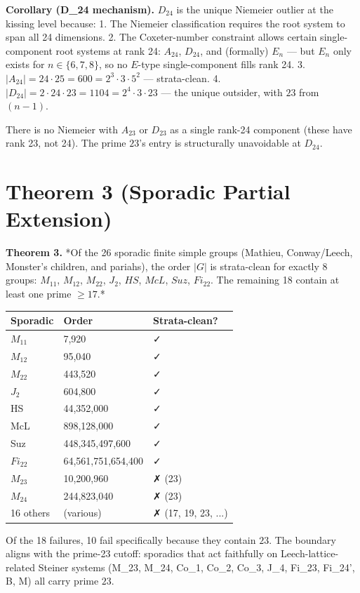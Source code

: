 \documentclass[11pt,reqno]{amsart}
\theoremstyle{plain}
\theoremstyle{definition}
\begin{document}
\textbf{Corollary (D_24 mechanism).} $D_{24}$ is the unique Niemeier outlier at the kissing level because:
1. The Niemeier classification requires the root system to span all 24 dimensions.
2. The Coxeter-number constraint allows certain single-component root systems at rank 24: $A_{24}$, $D_{24}$, and (formally) $E_n$ --- but $E_n$ only exists for $n \in \{6, 7, 8\}$, so no $E$-type single-component fills rank 24.
3. $|A_{24}| = 24 \cdot 25 = 600 = 2^3 \cdot 3 \cdot 5^2$ --- strata-clean.
4. $|D_{24}| = 2 \cdot 24 \cdot 23 = 1104 = 2^4 \cdot 3 \cdot 23$ --- the unique outsider, with $23$ from $(n-1)$.

There is no Niemeier with $A_{23}$ or $D_{23}$ as a single rank-24 component (these have rank 23, not 24). The prime $23$'s entry is structurally unavoidable at $D_{24}$.

\section{Theorem 3 (Sporadic Partial Extension)}

\textbf{Theorem 3.} *Of the 26 sporadic finite simple groups (Mathieu, Conway/Leech, Monster's children, and pariahs), the order $|G|$ is strata-clean for exactly 8 groups: $M_{11}$, $M_{12}$, $M_{22}$, $J_2$, $HS$, $McL$, $Suz$, $Fi_{22}$. The remaining 18 contain at least one prime $\geq 17$.*

\begin{center}
\begin{tabular}{lll}
\toprule
Sporadic & Order & Strata-clean? \\
\midrule
$M_{11}$ & 7,920 & ✓ \\
$M_{12}$ & 95,040 & ✓ \\
$M_{22}$ & 443,520 & ✓ \\
$J_2$ & 604,800 & ✓ \\
HS & 44,352,000 & ✓ \\
McL & 898,128,000 & ✓ \\
Suz & 448,345,497,600 & ✓ \\
$Fi_{22}$ & 64,561,751,654,400 & ✓ \\
$M_{23}$ & 10,200,960 & ✗ (23) \\
$M_{24}$ & 244,823,040 & ✗ (23) \\
16 others & (various) & ✗ (17, 19, 23, ...) \\
\bottomrule
\end{tabular}
\end{center}

Of the 18 failures, 10 fail specifically because they contain $23$. The boundary aligns with the prime-23 cutoff: sporadics that act faithfully on Leech-lattice-related Steiner systems (M_{23}, M_{24}, Co_1, Co_2, Co_3, J_4, Fi_{23}, Fi_{24}', B, M) all carry prime $23$.
\end{document}
